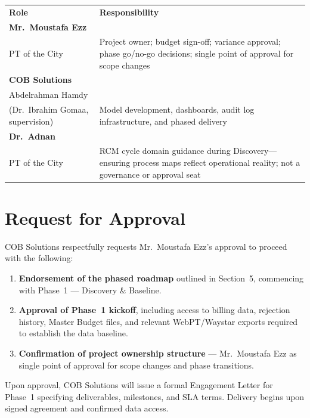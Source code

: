 \documentclass[11pt,a4paper]{article}
\begin{document}
\vspace{0.5em}
\begin{center}
\begin{tabularx}{0.92\linewidth}{L{4.5cm} X}
  \color{white}\textbf{Role} & \color{white}\textbf{Responsibility} \\
  \textbf{Mr.\ Moustafa Ezz}\\
  PT of the City &
    Project owner; budget sign-off; variance approval; phase go/no-go decisions;
    single point of approval for scope changes \\
  \textbf{COB Solutions}\\
  Abdelrahman Hamdy\\
  (Dr.\ Ibrahim Gomaa, supervision) &
    Model development, dashboards, audit log infrastructure, and phased delivery \\
  \textbf{Dr.\ Adnan}\\
  PT of the City &
    RCM cycle domain guidance during Discovery---ensuring process maps reflect
    operational reality; not a governance or approval seat \\
\end{tabularx}
\end{center}


\section{Request for Approval}

COB Solutions respectfully requests Mr.\ Moustafa Ezz's approval to proceed with the
following:

\begin{enumerate}
  \item \textbf{Endorsement of the phased roadmap} outlined in Section~5, commencing with
        Phase~1 --- Discovery \& Baseline.
  \item \textbf{Approval of Phase~1 kickoff}, including access to billing data, rejection
        history, Master Budget files, and relevant WebPT/Waystar exports required to
        establish the data baseline.
  \item \textbf{Confirmation of project ownership structure} --- Mr.\ Moustafa Ezz as
        single point of approval for scope changes and phase transitions.
\end{enumerate}

\vspace{1em}
\begin{tcolorbox}[infobox,title={Next Step}]
Upon approval, COB Solutions will issue a formal Engagement Letter for Phase~1 specifying
deliverables, milestones, and SLA terms. Delivery begins upon signed agreement and
confirmed data access.
\end{tcolorbox}

\vspace{2em}


\end{document}
